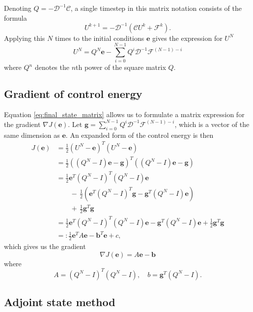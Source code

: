 \documentclass[utf8,english]{gradu3}
\begin{document}
Denoting $Q = -\mathcal{D}^{-1} \mathcal{C}$,
a single timestep in this matrix notation consists of the formula
\begin{equation}\label{eq:forward_timestep_matrix}
  U^{k+1} = -\mathcal{D}^{-1} (\mathcal{C} U^k + \mathcal{F}^k).
\end{equation}
Applying this $N$ times to the initial conditions $\mathbf{e}$ 
gives the expression for $U^N$
\begin{equation}\label{eq:final_state_matrix}
  U^N = Q^N \mathbf{e}
  - \sum_{i=0}^{N-1} Q^i \mathcal{D}^{-1} \mathcal{F}^{(N-1)-i}
\end{equation}
where $Q^n$ denotes the $n$th power of the square matrix $Q$.

\subsection{Gradient of control energy}

Equation \eqref{eq:final_state_matrix} allows us to formulate
a matrix expression for the gradient $\nabla J(\mathbf{e})$.
Let $\mathbf{g} = \sum_{i=0}^{N-1} Q^i \mathcal{D}^{-1} \mathcal{F}^{(N-1)-i}$,
which is a vector of the same dimension as $\mathbf{e}$.
An expanded form of the control energy is then
\begin{align*}
  J(\mathbf{e})
  &= \frac{1}{2} (U^N - \mathbf{e})^T (U^N - \mathbf{e}) \\
  &= \frac{1}{2} ((Q^N - I) \mathbf{e} - \mathbf{g})^T ((Q^N - I) \mathbf{e} - \mathbf{g}) \\
  &= \frac{1}{2} \mathbf{e}^T (Q^N - I)^T (Q^N - I) \mathbf{e} \\
  &\qquad -\, \frac{1}{2} (\mathbf{e}^T (Q^N - I)^T \mathbf{g}
    - \mathbf{g}^T (Q^N - I)\mathbf{e}) \\
  &\qquad +\, \frac{1}{2} \mathbf{g}^T \mathbf{g} \\
  &= \frac{1}{2} \mathbf{e}^T (Q^N - I)^T (Q^N - I) \mathbf{e}
  - \mathbf{g}^T (Q^N - I)\mathbf{e}
  + \frac{1}{2} \mathbf{g}^T \mathbf{g} \\
  &=: \frac{1}{2}\mathbf{e}^T A \mathbf{e} - \mathbf{b}^T \mathbf{e} + c,
\end{align*}
which gives us the gradient
\begin{equation}\label{eq:control_gradient}
  \nabla J(\mathbf{e}) = A\mathbf{e} - \mathbf{b}
\end{equation}
where
\[
  A = (Q^N - I)^T (Q^N - I),
  \quad b = \mathbf{g}^T (Q^N - I).
\]


\subsection{Adjoint state method}\label{sec:adjoint_state_method}
\end{document}
